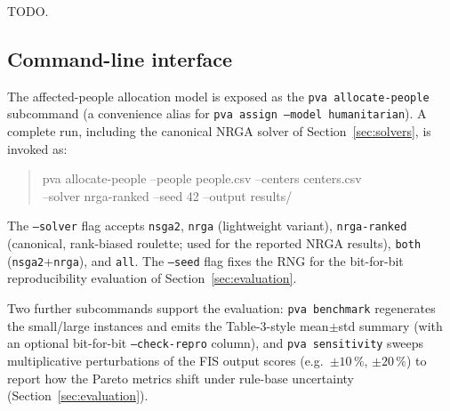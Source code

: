TODO.

\subsection{Command-line interface}
\label{sec:cli}

The affected-people allocation model is exposed as the \texttt{pva
allocate-people} subcommand (a convenience alias for \texttt{pva assign
--model humanitarian}). A complete run, including the canonical NRGA solver of
Section~\ref{sec:solvers}, is invoked as:
%
\begin{quote}\small\ttfamily
pva allocate-people --people people.csv --centers centers.csv \\
\hspace*{2em}--solver nrga-ranked --seed 42 --output results/
\end{quote}
%
The \texttt{--solver} flag accepts \texttt{nsga2}, \texttt{nrga} (lightweight
variant), \texttt{nrga-ranked} (canonical, rank-biased roulette; used for the
reported NRGA results), \texttt{both} (\texttt{nsga2}+\texttt{nrga}), and
\texttt{all}. The \texttt{--seed} flag fixes the RNG for the bit-for-bit
reproducibility evaluation of Section~\ref{sec:evaluation}.

Two further subcommands support the evaluation: \texttt{pva benchmark}
regenerates the small/large instances and emits the Table-3-style mean$\pm$std
summary (with an optional bit-for-bit \texttt{--check-repro} column), and
\texttt{pva sensitivity} sweeps multiplicative perturbations of the FIS output
scores (e.g.\ $\pm 10\,\%$, $\pm 20\,\%$) to report how the Pareto metrics shift
under rule-base uncertainty (Section~\ref{sec:evaluation}).
